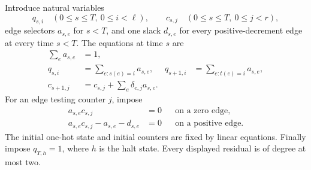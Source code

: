 \documentclass[11pt,a4paper]{article}
\theoremstyle{definition}
\theoremstyle{remark}
\begin{document}
Introduce natural variables
\[
 q_{s,i}\quad(0\le s\le T,\ 0\le i<\ell),\qquad
 c_{s,j}\quad(0\le s\le T,\ 0\le j<r),
\]
edge selectors $a_{s,e}$ for $s<T$, and one slack $d_{s,e}$ for every
positive-decrement edge at every time $s<T$. The equations at time $s$ are
\begin{align}
 \sum_e a_{s,e}&=1,\label{sdf:eq:oneedge}\\
 q_{s,i}&=\sum_{e:s(e)=i}a_{s,e},&
 q_{s+1,i}&=\sum_{e:t(e)=i}a_{s,e},\label{sdf:eq:states}\\
 c_{s+1,j}&=c_{s,j}+\sum_e\delta_{e,j}a_{s,e}.\label{sdf:eq:update}
\end{align}
For an edge testing counter $j$, impose
\begin{align}
 a_{s,e}c_{s,j}&=0&&\text{on a zero edge},\label{sdf:eq:zeroedge}\\
 a_{s,e}c_{s,j}-a_{s,e}-d_{s,e}&=0&&\text{on a positive edge}.\label{sdf:eq:posedge}
\end{align}
The initial one-hot state and initial counters are fixed by linear
equations. Finally impose $q_{T,h}=1$, where $h$ is the halt state.
Every displayed residual is of degree at most two.
\end{document}
